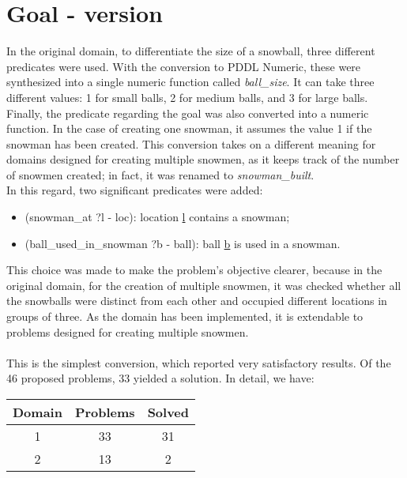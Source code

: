\documentclass{article}
\begin{document}
\section*{Goal - version}
In the original domain, to differentiate the size of a snowball, 
three different predicates were used. With the conversion to PDDL Numeric,
these were synthesized into a single numeric function called \textit{ball\_size}.
It can take three different values: 1 for small balls, 2 for medium balls, and 3 for large balls.
Finally, the predicate regarding the goal was also converted into a numeric function.
In the case of creating one snowman, it assumes 
the value 1 if the snowman has been created.
This conversion takes on a different meaning for domains designed for creating multiple snowmen, as it keeps track of the number of snowmen created; in fact, it was renamed to \textit{snowman\_built}.\\
In this regard, two significant predicates were added:\vspace{-0.15cm}
\begin{itemize}
    \item (snowman\_at ?l - loc): location \underline{l} contains a snowman;
\vspace{-0.15cm}
    \item (ball\_used\_in\_snowman ?b - ball): ball \underline{b} is used in a snowman.
\vspace{-0.15cm}
\end{itemize}
This choice was made to make the problem's objective clearer, because in the original domain, 
for the creation of multiple snowmen, it was checked whether all the snowballs were distinct from each other and
occupied different locations in groups of three.
As the domain has been implemented, it is extendable to problems
designed for creating multiple snowmen.\\ \\
This is the simplest conversion, which reported very satisfactory results.
Of the 46 proposed problems, 33 yielded a solution.
In detail, we have:\\
\begin{table}[H]
    \centering
    \begin{tabular}{|c|c|c|}
        \hline
        \textbf{Domain} & \textbf{Problems} & \textbf{Solved} \\
        \hline
        1 & 33 & 31 \\
        \hline
        2 & 13 & 2 \\
        \hline
    \end{tabular}
\end{table}
\end{document}
